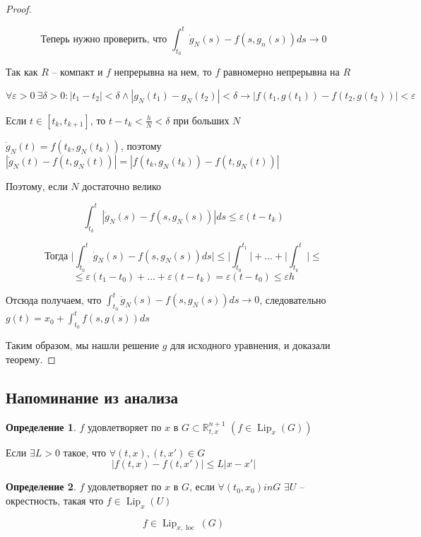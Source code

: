 \documentclass[a4paper]{article}
\theoremstyle{indented}
\theoremstyle{definition}
\newtheorem*{defn}{Определение}
\theoremstyle{remark}
\DeclareMathOperator{\Lip}{Lip}
\DeclareMathOperator{\loc}{loc}
\begin{document}
\begin{proof}
\begin{enumerate}
    \[\text{Теперь нужно проверить, что } \int_{t_0}^{t}\dot g_N(s) - f(s,g_n(s)) ds \to 0\]

    Так как $R$ -- компакт и $f$ непрерывна на нем, то $f$ равномерно непрерывна на $R$

    \[\forall \varepsilon > 0\ \exists \delta > 0 : |t_1 - t_2| < \delta \wedge |g_N(t_1) - g_N(t_2)| < \delta \to |f(t_1,g(t_1)) - f(t_2,g(t_2))| < \varepsilon     \]

    Если $t \in [t_k, t_{k+1}]$, то $t - t_k < \frac{h}{N} < \delta$ при больших $N$

    $\dot g_N(t) = f(t_k,g_N(t_k))$, поэтому $|\dot g_N(t) - f(t,g_N(t))| = |f(t_k,g_N(t_k)) - f(t,g_N(t))|$

    Поэтому, если $N$ достаточно велико

    \[\int_{t_k}^{t}|\dot g_N(s) - f(s,g_N(s)) | ds \leqslant \varepsilon (t-t_k)\]

    \[\text{Тогда }\bigg| \int_{t_0}^{t}\dot g_N(s) - f(s,g_N(s))ds \bigg| \leqslant  \bigg|\int_{t_0}^{t_1}\bigg| + \ldots + \bigg|\int_{t_k}^{t}\bigg| \leqslant \]
    \[\leqslant \varepsilon (t_1-t_0) +\ldots + \varepsilon(t- t_k) = \varepsilon (t - t_0)  \leqslant \varepsilon h\]

    Отсюда получаем, что $\int_{t_0}^{t}\dot g_N(s) - f(s,g_N(s))ds \to 0$, следовательно $g(t) = x_0 + \int_{t_0}^{t}f(s,g(s))ds$

   
  \end{enumerate}

  Таким образом, мы нашли решение $g$ для исходного уравнения, и доказали теорему.
  
\end{proof}

\subsection{Напоминание из анализа}


\begin{defn}
  $f$  удовлетворяет  по $x$ в $G \subset \mathbb{R}_{t,x}^{n+1}$ $(f \in \Lip_x(G))$

  Если $\exists L > 0$ такое, что $\forall (t,x), (t,x') \in G$
  $$|f(t,x) - f(t,x')| \leqslant L|x - x'|$$

  

\end{defn}

\begin{defn}
  $f$ удовлетворяет  по $x$ в $G$, если $\forall (t_0,x_0) in G$ $\exists U$ -- окрестность, такая что $f \in \Lip_x(U)$

  \[f \in \Lip_{x, \loc}(G)\]

\end{defn}
\end{document}
